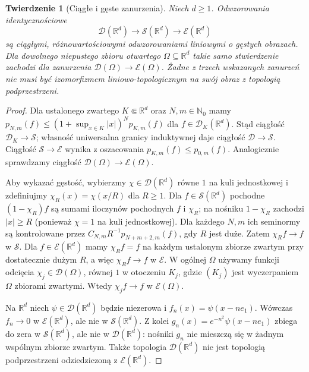 \documentclass[11pt,a4paper]{article}
\numberwithin{equation}{section}
\theoremstyle{plain}
\newtheorem{twierdzenie}{Twierdzenie}[section]
\theoremstyle{definition}
\theoremstyle{remark}
\newcommand{\R}{\mathbb R}
\newcommand{\N}{\mathbb N}
\begin{document}
\begin{twierdzenie}[Ciągłe i gęste zanurzenia]
\label{thm:zanurzenia25}
Niech $d\ge1$. Odwzorowania identycznościowe
\[
 \mathcal D(\R^d)\longrightarrow\mathcal S(\R^d)
 \longrightarrow\mathcal E(\R^d)
\]
są ciągłymi, różnowartościowymi odwzorowaniami liniowymi o gęstych
obrazach. Dla dowolnego niepustego zbioru otwartego $\Omega\subseteq\R^d$
takie samo stwierdzenie zachodzi dla zanurzenia
$\mathcal D(\Omega)\to\mathcal E(\Omega)$.
Żadne z trzech wskazanych zanurzeń nie musi być izomorfizmem
liniowo-topologicznym na swój obraz z topologią podprzestrzeni.
\end{twierdzenie}
\begin{proof}
Dla ustalonego zwartego $K\Subset\R^d$ oraz $N,m\in\N_0$
mamy $p_{N,m}(f)\le (1+\sup_{x\in K}|x|)^N p_{K,m}(f)$
dla $f\in\mathcal D_K(\R^d)$. Stąd ciągłość
$\mathcal D_K\to\mathcal S$; własność uniwersalna granicy
induktywnej daje ciągłość $\mathcal D\to\mathcal S$.
Ciągłość $\mathcal S\to\mathcal E$ wynika z oszacowania
$p_{K,m}(f)\le p_{0,m}(f)$. Analogicznie sprawdzamy
ciągłość $\mathcal D(\Omega)\to\mathcal E(\Omega)$.

Aby wykazać gęstość, wybierzmy $\chi\in\mathcal D(\R^d)$
równe $1$ na kuli jednostkowej i zdefiniujmy
$\chi_R(x)=\chi(x/R)$ dla $R\ge1$. Dla
$f\in\mathcal S(\R^d)$ pochodne $(1-\chi_R)f$ są sumami
iloczynów pochodnych $f$ i $\chi_R$; na nośniku
$1-\chi_R$ zachodzi $|x|\ge R$ (ponieważ $\chi=1$ na kuli jednostkowej). Dla każdego $N,m$ ich seminormy są
kontrolowane przez $C_{N,m}R^{-1}p_{N+m+2,m}(f)$,
gdy $R$ jest duże. Zatem $\chi_R f\to f$ w $\mathcal S$.
Dla $f\in\mathcal E(\R^d)$ mamy $\chi_Rf=f$ na każdym
ustalonym zbiorze zwartym przy dostatecznie dużym $R$,
a więc $\chi_Rf\to f$ w $\mathcal E$. W ogólnej
$\Omega$ używamy funkcji odcięcia $\chi_j\in\mathcal D(\Omega)$,
równej $1$ w otoczeniu $K_j$, gdzie $(K_j)$ jest
wyczerpaniem $\Omega$ zbiorami zwartymi. Wtedy
$\chi_j f\to f$ w $\mathcal E(\Omega)$.

Na $\R^d$ niech $\psi\in\mathcal D(\R^d)$ będzie niezerowa
i $f_n(x)=\psi(x-ne_1)$. Wówczas $f_n\to0$ w
$\mathcal E(\R^d)$, ale nie w $\mathcal S(\R^d)$.
Z kolei $g_n(x)=e^{-n^2}\psi(x-ne_1)$ zbiega do zera w
$\mathcal S(\R^d)$, ale nie w $\mathcal D(\R^d)$:
nośniki $g_n$ nie mieszczą się w żadnym wspólnym zbiorze
zwartym. Także topologia $\mathcal D(\R^d)$ nie jest
topologią podprzestrzeni odziedziczoną z $\mathcal E(\R^d)$.
\end{proof}
\end{document}
